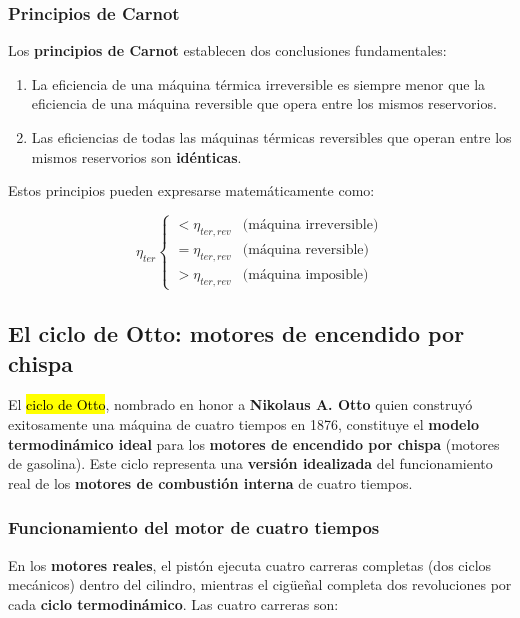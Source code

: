 \documentclass{article}
\begin{document}
    \subsubsection{Principios de Carnot}

    Los \textbf{principios de Carnot} establecen dos conclusiones fundamentales:

    \begin{enumerate}
        \item La eficiencia de una máquina térmica irreversible es siempre menor que la eficiencia de una máquina reversible que opera entre los mismos reservorios.
        \item Las eficiencias de todas las máquinas térmicas reversibles que operan entre los mismos reservorios son \textbf{idénticas}.
    \end{enumerate}

    Estos principios pueden expresarse matemáticamente como:

    \begin{equation}
    \eta_{ter} \begin{cases}
    < \eta_{ter,rev} & \text{(máquina irreversible)} \\
    = \eta_{ter,rev} & \text{(máquina reversible)} \\
    > \eta_{ter,rev} & \text{(máquina imposible)}
    \end{cases}
    \end{equation}

    \subsection{El ciclo de Otto: motores de encendido por chispa}

    El \hl{ciclo de Otto}, nombrado en honor a \textbf{Nikolaus A. Otto} quien construyó exitosamente una máquina de cuatro tiempos en 1876, constituye el \textbf{modelo termodinámico ideal} para los \textbf{motores de encendido por chispa} (motores de gasolina). Este ciclo representa una \textbf{versión idealizada} del funcionamiento real de los \textbf{motores de combustión interna} de cuatro tiempos.

    \subsubsection{Funcionamiento del motor de cuatro tiempos}

    En los \textbf{motores reales}, el pistón ejecuta cuatro carreras completas (dos ciclos mecánicos) dentro del cilindro, mientras el cigüeñal completa dos revoluciones por cada \textbf{ciclo termodinámico}. Las cuatro carreras son:
\end{document}
